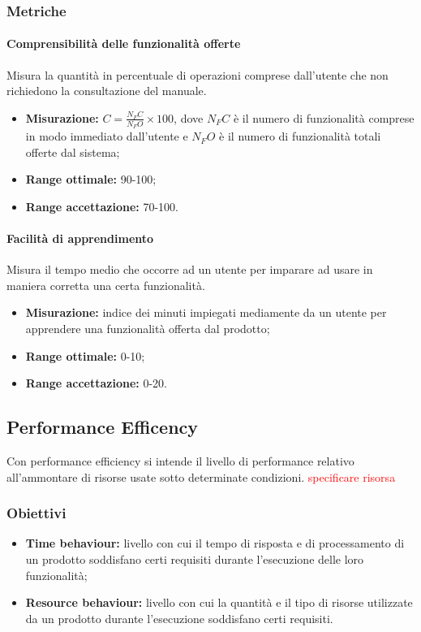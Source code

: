 		\subsubsection{Metriche}
			\paragraph{Comprensibilità delle funzionalità offerte} \Spazio 
			Misura la quantità in percentuale di operazioni comprese dall'utente che non richiedono la consultazione del manuale.
			\begin{itemize}
				\item {\textbf{Misurazione:} $C=\frac{N_FC}{N_FO}\times 100$, dove $N_FC$ è il numero di funzionalità comprese in modo immediato dall'utente e $N_FO$ è il numero di funzionalità totali offerte dal sistema};
				\item {\textbf{Range ottimale:} 90-100;}
				\item {\textbf{Range accettazione:} 70-100.}
			\end{itemize} 
			\paragraph{Facilità di apprendimento} \Spazio 
			Misura il tempo medio che occorre ad un utente per imparare ad usare in maniera corretta una certa funzionalità.
			\begin{itemize}
				\item {\textbf{Misurazione:} indice dei minuti impiegati mediamente da un utente per apprendere una funzionalità offerta dal prodotto};
				\item {\textbf{Range ottimale:} 0-10;}
				\item {\textbf{Range accettazione:} 0-20.}
			\end{itemize} 
			
	\subsection{Performance Efficency}
		Con performance efficiency si intende il livello di performance relativo all'ammontare di risorse usate sotto determinate condizioni. \textcolor{red}{specificare risorsa}
		\subsubsection{Obiettivi}
			\begin{itemize}
				\item {\textbf{Time behaviour:} livello con cui il tempo di risposta e di processamento di un prodotto soddisfano certi requisiti durante l'esecuzione delle loro funzionalità;}
				\item {\textbf{Resource behaviour:} livello con cui la quantità e il tipo di risorse utilizzate da un prodotto durante l'esecuzione soddisfano certi requisiti.}
			\end{itemize}
